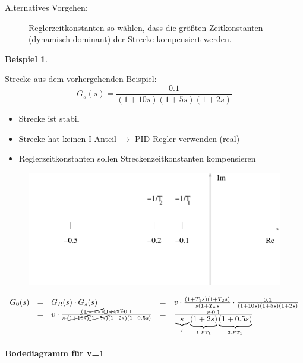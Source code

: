 \documentclass[12pt,a4paper,ngerman]{scrartcl}
\newtheorem{bsp}{Beispiel}[section] %
\begin{document}
\begin{description}
\item[Alternatives Vorgehen:] Reglerzeitkonstanten so wählen, dass die größten Zeitkonstanten (dynamisch dominant) der Strecke kompensiert werden. 
\end{description}
\begin{bsp} 
\end{bsp}
Strecke aus dem vorhergehenden Beispiel:
\[
G_s(s)=\frac{0.1}{(1+10s)(1+5s)(1+2s)}
\]
\begin{itemize}
\item Strecke ist stabil \checkmark
\item Strecke hat keinen I-Anteil $\rightarrow$ PID-Regler verwenden (real)
\item Reglerzeitkonstanten sollen Streckenzeitkonstanten kompensieren
\end{itemize}

\begin{figure}[H]
  \centering
\includegraphics[width=0.7\linewidth]{sysregel_bsp_5_4}  
\end{figure}
\begin{align*}
  \begin{array}{lllll}
  G_0(s)&=&G_R(s)\cdot G_s(s)&=&v \cdot \frac{(1+T_1s)(1+T_2s)}{s(1+T_ns} \cdot \frac{0.1}{(1+10s)(1+5s)(1+2s)} \\
&=&v\cdot \frac{\cancel{(1+10s)}\cancel{(1+5s)}\cdot 0.1}{s\cdot \cancel{(1+10s)}\cancel{(1+5s)}(1+2s)(1+0.5s)}&=&\frac{v\cdot 0.1}{\underbrace{s}_{I}\underbrace{(1+2s)}_{1. PT_1}\underbrace{(1+0.5s)}_{2. PT_1}}
  \end{array}
\end{align*}

\paragraph{Bodediagramm für v=1}
\end{document}
